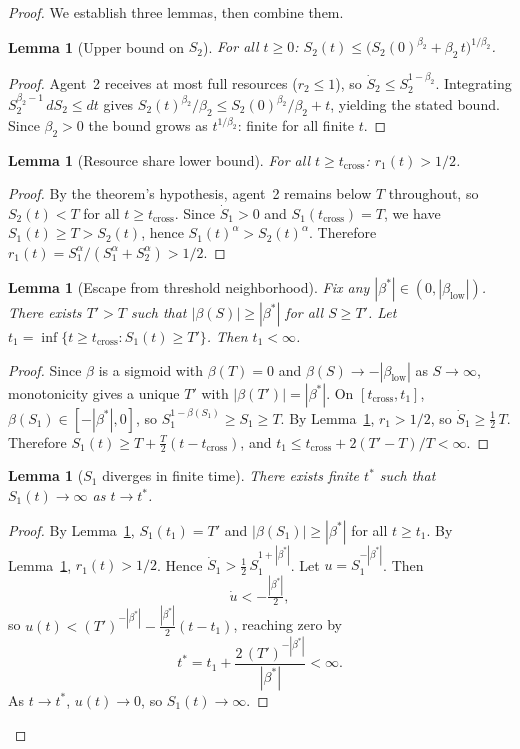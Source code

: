 \documentclass[11pt,letterpaper]{article}
\theoremstyle{plain}
\newtheorem{lemma}[theorem]{Lemma}
\theoremstyle{definition}
\theoremstyle{remark}
\newcommand{\betaL}{\beta_{\mathrm{low}}}
\newcommand{\tcross}{t_{\mathrm{cross}}}
\newcommand{\tstar}{t^{*}}
\begin{document}
\begin{proof}
We establish three lemmas, then combine them.

\begin{lemma}[Upper bound on $S_2$]
\label{lem:s2bound}
For all $t \geq 0$:
$S_2(t) \leq \bigl(S_2(0)^{\beta_2} + \beta_2\, t\bigr)^{1/\beta_2}$.
\end{lemma}
\begin{proof}
Agent~2 receives at most full resources ($r_2 \leq 1$), so
$\dot{S}_2 \leq S_2^{1-\beta_2}$.
Integrating $S_2^{\beta_2-1}\,dS_2 \leq dt$ gives
$S_2(t)^{\beta_2}/\beta_2 \leq S_2(0)^{\beta_2}/\beta_2 + t$,
yielding the stated bound.
Since $\beta_2 > 0$ the bound grows as $t^{1/\beta_2}$: finite for all finite $t$.
\end{proof}

\begin{lemma}[Resource share lower bound]
\label{lem:rmin}
For all $t \geq \tcross$: $r_1(t) > 1/2$.
\end{lemma}
\begin{proof}
By the theorem's hypothesis, agent~2 remains below $T$ throughout, so
$S_2(t) < T$ for all $t \geq \tcross$.
Since $\dot{S}_1 > 0$ and $S_1(\tcross) = T$, we have $S_1(t) \geq T > S_2(t)$,
hence $S_1(t)^\alpha > S_2(t)^\alpha$.
Therefore $r_1(t) = S_1^\alpha/(S_1^\alpha + S_2^\alpha) > 1/2$.
\end{proof}

\begin{lemma}[Escape from threshold neighborhood]
\label{lem:escape}
Fix any $|\beta^*| \in (0, |\betaL|)$.
There exists $T' > T$ such that $|\beta(S)| \geq |\beta^*|$ for all $S \geq T'$.
Let $t_1 = \inf\{t \geq \tcross : S_1(t) \geq T'\}$.
Then $t_1 < \infty$.
\end{lemma}
\begin{proof}
Since $\beta$ is a sigmoid with $\beta(T) = 0$ and $\beta(S) \to -|\betaL|$ as
$S \to \infty$, monotonicity gives a unique $T'$ with $|\beta(T')| = |\beta^*|$.
On $[\tcross, t_1]$, $\beta(S_1) \in [-|\beta^*|, 0]$, so
$S_1^{1-\beta(S_1)} \geq S_1 \geq T$.
By Lemma~\ref{lem:rmin}, $r_1 > 1/2$, so
$\dot{S}_1 \geq \tfrac{1}{2}\,T$.
Therefore $S_1(t) \geq T + \tfrac{T}{2}(t - \tcross)$,
and $t_1 \leq \tcross + 2(T' - T)/T < \infty$.
\end{proof}

\begin{lemma}[$S_1$ diverges in finite time]
\label{lem:s1blow}
There exists finite $\tstar$ such that $S_1(t) \to \infty$ as $t \to \tstar$.
\end{lemma}
\begin{proof}
By Lemma~\ref{lem:escape}, $S_1(t_1) = T'$ and $|\beta(S_1)| \geq |\beta^*|$
for all $t \geq t_1$.
By Lemma~\ref{lem:rmin}, $r_1(t) > 1/2$.
Hence $\dot{S}_1 > \tfrac{1}{2}\,S_1^{1+|\beta^*|}$.
Let $u = S_1^{-|\beta^*|}$. Then
\[
  \dot{u} < -\tfrac{|\beta^*|}{2},
\]
so $u(t) < (T')^{-|\beta^*|} - \tfrac{|\beta^*|}{2}(t - t_1)$,
reaching zero by
\[
  \tstar = t_1 + \frac{2\,(T')^{-|\beta^*|}}{|\beta^*|} < \infty.
\]
As $t \to \tstar$, $u(t) \to 0$, so $S_1(t) \to \infty$.
\end{proof}


\end{proof}
\end{document}
